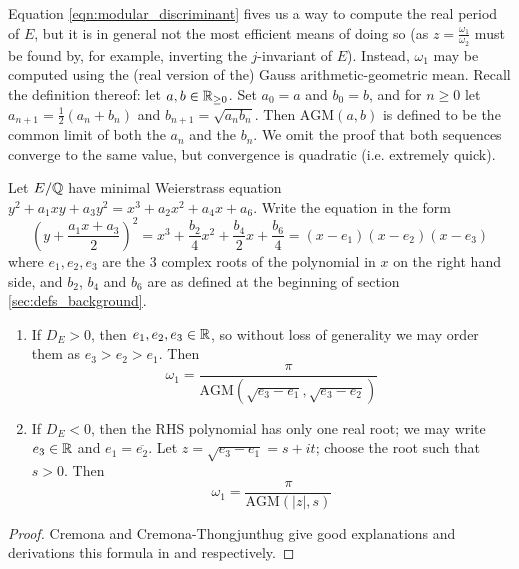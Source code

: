 \documentclass[10pt]{article}
\newcommand{\AGM}{\text{AGM}}
\newcommand{\conj}[1]{\overline{#1}}
\begin{document}
Equation \ref{eqn:modular_discriminant} fives us a way to compute the real period of $E$, but it is in general not the most efficient means of doing so (as $z = \frac{\omega_1}{\omega_2}$ must be found by, for example, inverting the $j$-invariant of $E$). Instead, $\omega_1$ may be computed using the (real version of the) Gauss arithmetic-geometric mean. Recall the definition thereof: let $a,b \in \mathbb{R}_{\ge0}$. Set $a_0 = a$ and $b_0 = b$, and for $n\ge 0$ let $a_{n+1} = \frac{1}{2}(a_{n}+b_{n})$ and $b_{n+1} = \sqrt{a_{n}b_{n}}$. Then $\AGM(a,b)$ is defined to be the common limit of both the $a_n$ and the $b_n$. We omit the proof that both sequences converge to the same value, but convergence is quadratic (i.e. extremely quick).

\begin{proposition}\label{prop:real_period_by_AGM}
Let $E/\mathbb{Q}$ have minimal Weierstrass equation $y^2 + a_1 xy + a_3 y^2 = x^3 + a_2 x^2 + a_4 x + a_6$. Write the equation in the form
\begin{equation}\label{eqn:weierstrass_with_bn}
\left(y + \frac{a_1x + a_3}{2}\right)^2 = x^3 + \frac{b_2}{4} x^2 + \frac{b_4}{2} x + \frac{b_6}{4} = (x-e_1)(x-e_2)(x-e_3)
\end{equation}
where $e_1,e_2,e_3$ are the 3 complex roots of the polynomial in $x$ on the right hand side, and $b_2$, $b_4$ and $b_6$ are as defined at the beginning of section \ref{sec:defs_background}.
\begin{enumerate}
\item If $D_E > 0$, then $e_1,e_2,e_3 \in \mathbb{R}$, so without loss of generality we may order them as $e_3 > e_2 > e_1$. Then
\begin{equation}\label{eqn:omega_D_pos}
\omega_1 = \frac{\pi}{\AGM(\sqrt{e_3-e_1},\sqrt{e_3-e_2})}
\end{equation}
\item If $D_E < 0$, then the RHS polynomial has only one real root; we may write $e_3 \in \mathbb{R}$ and $e_1 = \conj{e_2}$. Let $z = \sqrt{e_3-e_1} = s + it$; choose the root such that $s>0$. Then
\begin{equation}\label{eqn:omega_D_neg}
\omega_1 = \frac{\pi}{\AGM(|z|,s)}
\end{equation}
\end{enumerate}
\end{proposition}
\begin{proof}
Cremona and Cremona-Thongjunthug give good explanations and derivations this formula in \cite{Cre-1997} and \cite{Cre-2013} respectively.
\end{proof}
\end{document}
